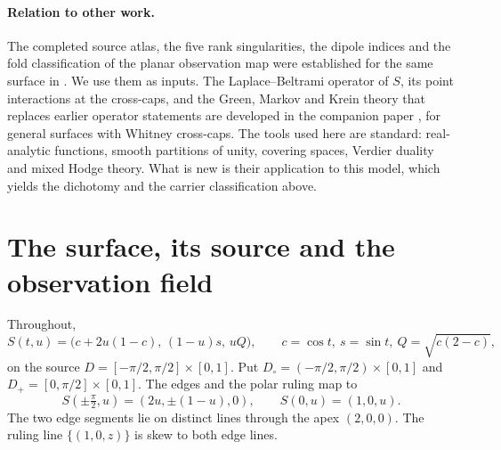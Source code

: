 \documentclass[11pt]{article}
\theoremstyle{definition}\newtheorem{definition}[theorem]{Definition}
\theoremstyle{remark}\newtheorem{remark}[theorem]{Remark}
\begin{document}
\paragraph{Relation to other work.} The completed source atlas, the five rank
singularities, the dipole indices and the fold classification of the planar
observation map were established for the same surface in \cite{ruled,stokes}.
We use them as inputs. The Laplace--Beltrami operator of $S$, its point
interactions at the cross-caps, and the Green, Markov and Krein theory that
replaces earlier operator statements are developed in the companion paper
\cite{companion}, for general surfaces with Whitney cross-caps. The tools used
here are standard: real-analytic functions, smooth partitions of unity,
covering spaces, Verdier duality and mixed Hodge theory. What is new is their
application to this model, which yields the dichotomy and the carrier
classification above.

\section{The surface, its source and the observation field}\label{sec:model}
Throughout,
\begin{equation}\label{eq:S}
 S(t,u)=\bigl(c+2u(1-c),\,(1-u)s,\,uQ\bigr),\qquad
 c=\cos t,\ s=\sin t,\ Q=\sqrt{c(2-c)},
\end{equation}
on the source $D=[-\pi/2,\pi/2]\times[0,1]$. Put
$D_\circ=(-\pi/2,\pi/2)\times[0,1]$ and $D_+=[0,\pi/2]\times[0,1]$. The edges
and the polar ruling map to
\begin{equation}\label{eq:edges}
 S(\pm\tfrac\pi2,u)=(2u,\pm(1-u),0),\qquad S(0,u)=(1,0,u).
\end{equation}
The two edge segments lie on distinct lines through the apex $(2,0,0)$. The
ruling line $\{(1,0,z)\}$ is skew to both edge lines.
\end{document}
